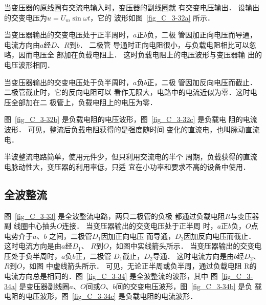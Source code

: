 当变压器的原线圈有交流电输入时，变压器的副线圈就
有交变电压输出．
设输出的交变电压为$u=U_m\sin\omega t$，它的
波形如图~\ref{fig_C_3-32a} 所示．


当变压器输出的交变电压处于正半周时，$a$正$b$负，二极
管因加正向电压而导通，电流方向由$a$经$D$、$R$到$b$．
二极管
导通时正向电阻很小，与负载电阻相比可以忽略，因而电压全
部加在负载电阻上．
这时负载电阻上的电压波形与变压器输
出的电压波形相同．

当变压器输出的交变电压处于负半周时，$a$负$b$正，二极
管因加反向电压而截止．
二极管截止时，它的反向电阻可以
看作无限大，电路中的电流近似为零．这时电压全部加在二
极管上，负载电阻上的电压为零．

图~\ref{fig_C_3-32b} 是负载电阻的电压波形，图~\ref{fig_C_3-32c} 是负载电
阻的电流波形．
可见，整流后负载电阻获得的是强度随时间
变化的直流电，也叫脉动直流电．

半波整流电路简单，使用元件少，但只利用交流电的半个
周期，负载获得的直流电脉动性大，变压器的利用率低，只适
宜在小功率和要求不高的设备中使用．

\subsection{全波整流}


图~\ref{fig_C_3-33} 是全波整流电路，两只二极管的负极
都通过负载电阻$R$与变压器副
线圈中心抽头$O$连接．
当变压器输出的交变电压处于正半周
时，$a$正$b$负，$O$点电势介于$a$、$b$
之间，二极管$D_1$因加正向电压
而导通，$D_2$因加反向电压而截止．
这时电流方向是由$a$经$D_1$、
$R$到$O$，如图中实线箭头所示．
当变压器输出的交变电压处于负半周时，$a$负$b$正，二极管
$D_1$截止，$D_2$导通．
这时电流方向是由$b$经$D_2$、$R$到$O$，如图
中虚线箭头所示．
可见，无论正半周或负半周，通过负载电阻
R的电流方向总是相同的．图~\ref{fig_C_3-34} 是全波整流的波形，其中
图~\ref{fig_C_3-34a} 是变压器副线圈$a$、$O$间或$O$、$b$间的交变电压波形，图~\ref{fig_C_3-34b} 是负
载电阻的电压波形，图~\ref{fig_C_3-34c} 是负载电阻的电流波形．

